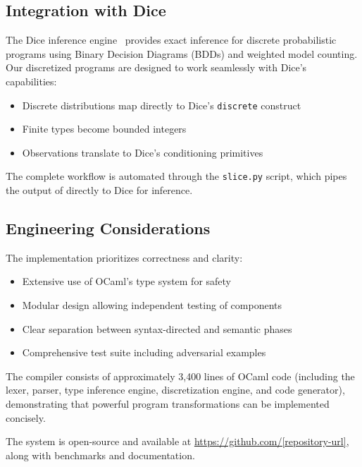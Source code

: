 \subsection{Integration with Dice}

The Dice inference engine~\cite{Holtzen2020Dice} provides exact inference for discrete probabilistic programs using Binary Decision Diagrams (BDDs) and weighted model counting. Our discretized programs are designed to work seamlessly with Dice's capabilities:
\begin{itemize}
    \item Discrete distributions map directly to Dice's \texttt{discrete} construct
    \item Finite types become bounded integers
    \item Observations translate to Dice's conditioning primitives
\end{itemize}

The complete workflow is automated through the \texttt{slice.py} script, which pipes the output of \Slice{} directly to Dice for inference.

\subsection{Engineering Considerations}

The implementation prioritizes correctness and clarity:
\begin{itemize}
    \item Extensive use of OCaml's type system for safety
    \item Modular design allowing independent testing of components
    \item Clear separation between syntax-directed and semantic phases
    \item Comprehensive test suite including adversarial examples
\end{itemize}

The \Slice{} compiler consists of approximately 3,400 lines of OCaml code (including the lexer, parser, type inference engine, discretization engine, and code generator), demonstrating that powerful program transformations can be implemented concisely.

The system is open-source and available at \url{https://github.com/[repository-url]}, along with benchmarks and documentation.


